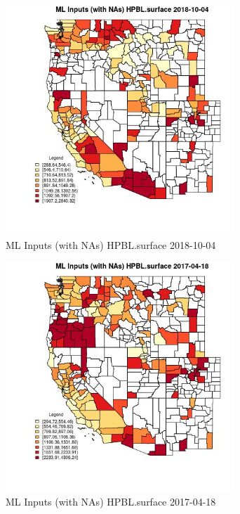 \begin{figure} 
\centering  
\includegraphics[width=0.77\textwidth]{Code_Outputs/Report_ML_input_PM25_Step4_part_f_de_duplicated_aves_prioritize_24hr_obswNAs_CountyHPBLsurfaceMean2018-10-04.jpg} 
\caption{\label{fig:Report_ML_input_PM25_Step4_part_f_de_duplicated_aves_prioritize_24hr_obswNAsCountyHPBLsurfaceMean2018-10-04}ML Inputs (with NAs) HPBL.surface 2018-10-04} 
\end{figure} 
 

\begin{figure} 
\centering  
\includegraphics[width=0.77\textwidth]{Code_Outputs/Report_ML_input_PM25_Step4_part_f_de_duplicated_aves_prioritize_24hr_obswNAs_CountyHPBLsurfaceMean2017-04-18.jpg} 
\caption{\label{fig:Report_ML_input_PM25_Step4_part_f_de_duplicated_aves_prioritize_24hr_obswNAsCountyHPBLsurfaceMean2017-04-18}ML Inputs (with NAs) HPBL.surface 2017-04-18} 
\end{figure} 
 

